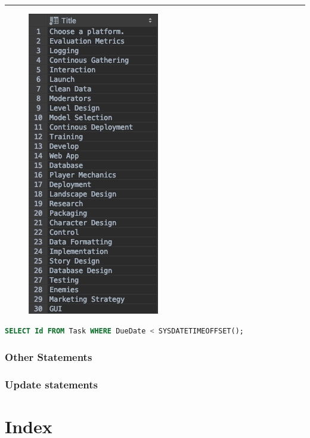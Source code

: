\documentclass[letterpaper]{article}
\begin{document}
\hrule
\begin{figure}[H]
\centering
\includegraphics[scale=0.5]{Images/OverdueTasks}
\end{figure}
\begin{lstlisting}[language=SQL, caption=Select All Overdue Tasks]
SELECT Id FROM Task WHERE DueDate < SYSDATETIMEOFFSET();
\end{lstlisting}


\subsubsection{Other Statements}

\subsubsection{Update statements}

\section{Index}
\lstlistoflistings
\end{document}
